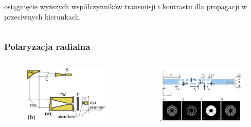 \documentclass{beamer}
\begin{document}
\begin{frame}
\begin{columns}
\begin{column}{0.5\textwidth}
osiągnięcie wyższych współczynników transmisji i kontrastu dla propagacji w przeciwnych kierunkach.
		\end{column}
	\end{columns}
		
\end{frame}

\begin{frame}
	\frametitle{Polaryzacja radialna}
	\begin{columns}
		\begin{column}{0.5\textwidth}
			\begin{figure}
				\includegraphics[width=\textwidth]{../images/dmg/express_exp_setu.png}\\
			\end{figure}
		\end{column}
		\begin{column}{0.5\textwidth}
			\begin{figure}
				\includegraphics[width=\textwidth]{../images/dmg/express_siatki.png}\\
			\end{figure}
		\end{column}
	\end{columns}
	\cite{Yavorskiy:14}
		
\end{frame}
\end{document}

